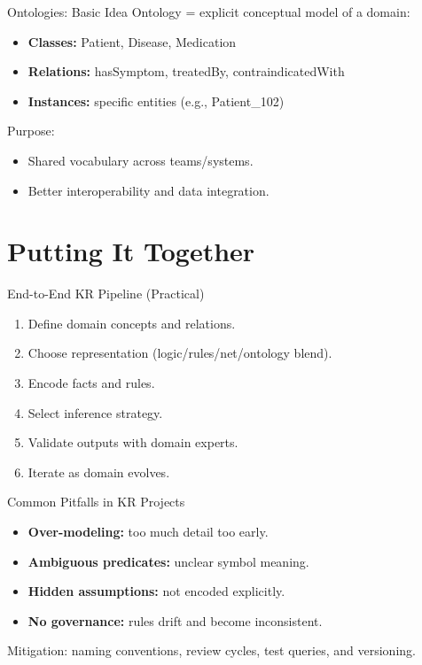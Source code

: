 \documentclass[10pt]{beamer}
\begin{document}
\begin{frame}{Ontologies: Basic Idea}
    Ontology = explicit conceptual model of a domain:
    \begin{itemize}
        \item \textbf{Classes:} Patient, Disease, Medication
        \item \textbf{Relations:} hasSymptom, treatedBy, contraindicatedWith
        \item \textbf{Instances:} specific entities (e.g., Patient\_102)
    \end{itemize}
    \vspace{0.2cm}
    Purpose:
    \begin{itemize}
        \item Shared vocabulary across teams/systems.
        \item Better interoperability and data integration.
    \end{itemize}
\end{frame}

\section{Putting It Together}

\begin{frame}{End-to-End KR Pipeline (Practical)}
    \begin{enumerate}
        \item Define domain concepts and relations.
        \item Choose representation (logic/rules/net/ontology blend).
        \item Encode facts and rules.
        \item Select inference strategy.
        \item Validate outputs with domain experts.
        \item Iterate as domain evolves.
    \end{enumerate}
\end{frame}

\begin{frame}{Common Pitfalls in KR Projects}
    \begin{itemize}
        \item \textbf{Over-modeling:} too much detail too early.
        \item \textbf{Ambiguous predicates:} unclear symbol meaning.
        \item \textbf{Hidden assumptions:} not encoded explicitly.
        \item \textbf{No governance:} rules drift and become inconsistent.
    \end{itemize}
    \vspace{0.2cm}
    Mitigation: naming conventions, review cycles, test queries, and versioning.
\end{frame}
\end{document}
